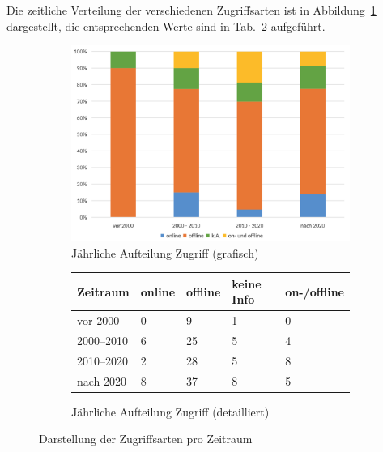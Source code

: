 Die zeitliche Verteilung der verschiedenen Zugriffsarten ist in Abbildung~\ref{fig:12-zugriff-jahr} dargestellt, die entsprechenden Werte sind in Tab.~\ref{tab:zugriff-zeit} aufgeführt.

\begin{figure}[!htbp]
    \centering
    \begin{subfigure}[b]{0.48\textwidth}
        \centering
        \includegraphics[width=\textwidth]{graphics_lit/12-zugriff-jahr.png}
        \caption{Jährliche Aufteilung Zugriff (grafisch)}
        \label{fig:12-zugriff-jahr}
    \end{subfigure}
    \hfill
    \begin{subfigure}[b]{0.48\textwidth}
        \centering
        \tiny
        \begin{tabularx}{\textwidth}{lXXXX}
            \hline
            \textbf{Zeitraum} & \textbf{online} & \textbf{offline} & \textbf{keine Info} & \textbf{on-/offline} \\
            \hline
            vor 2000      & 0  & 9  & 1 & 0 \\
            2000--2010    & 6  & 25 & 5 & 4 \\
            2010--2020    & 2  & 28 & 5 & 8 \\
            nach 2020     & 8  & 37 & 8 & 5 \\
            \hline
        \end{tabularx}
        \caption{Jährliche Aufteilung Zugriff (detailliert)}
        \label{tab:zugriff-zeit}
    \end{subfigure}
    \caption{Darstellung der Zugriffsarten pro Zeitraum}
    \label{fig:zugriff-gesamt}
\end{figure}

